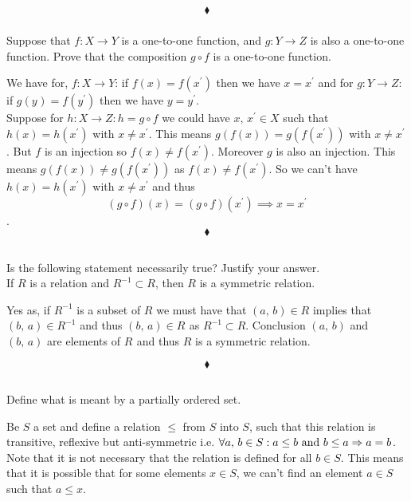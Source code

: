 $$\blacklozenge$$

\subsubsection{}
\begin{tcolorbox}
Suppose that $f:X\rightarrow Y$ is a one-to-one function, and $g: Y \rightarrow Z$ is also a one-to-one function. Prove that the composition $g \circ f$ is a one-to-one function. 
\end{tcolorbox}
We have for, $f:X\rightarrow Y$: if $f(x)=f(x^{'})$ then we have $x=x^{'}$ and for $g:Y\rightarrow Z$: if $g(y^{})=f(y^{'})$ then we have $y=y^{'}$.\\
Suppose for $h:X\rightarrow Z: h=g\circ f$ we could have $x,\, x^{'}\in X$ such that  $h(x)=h(x^{'})$  with $x\neq x^{'}$.
This means $g(f(x))=g(f(x^{'}))$ with $x\neq x^{'}$. But $f$ is an injection so $f(x)\neq f(x^{'})$. Moreover $g$ is also an injection. This means  $g(f(x))\neq g(f(x^{'}))$ as  $f(x)\neq f(x^{'})$. So we can't have $h(x)=h(x^{'})$ with $x\neq x^{'}$ and thus $$(g\circ f)(x)=(g\circ f)(x^{'})\implies x=x^{'}$$.
$$\blacklozenge$$


\renewcommand{\thesubsection}{\thesection.\RomanNumeralCaps{9}}
\subsection{}
\begin{tcolorbox}
Is the following statement necessarily true? Justify your answer.\\ If $R$ is a relation and $R^{-1} \subset R$, then $R$ is a symmetric relation. 
\end{tcolorbox}
Yes as, if $R^{-1}$ is a subset of $R$  we must  have that $(a,\, b) \in R$ implies that  $(b,\, a) \in R^{-1}$ and thus $(b,\, a) \in R^{}$ as $R^{-1} \subset R$. Conclusion  $(a,\, b)$ and  $(b,\, a)$ are elements of $R^{}$ and thus $R$ is a symmetric relation. 

$$\blacklozenge$$
\newpage

\renewcommand{\thesubsection}{\thesection.\RomanNumeralCaps{10}}
\subsection{}
\subsubsection{}
\begin{tcolorbox}
Define what is meant by a partially ordered set.
\end{tcolorbox}
Be $S$ a set and define a relation $\leq$ from $S$ into $S$, such that this relation is transitive, reflexive but anti-symmetric i.e. $\forall a,\, b\in S: a\leq b\text{ and } b\leq a\Rightarrow a=b$. Note that it is not necessary that the relation is defined for all $b\in S$. This means that it is possible that for some elements $x\in S$, we can't find an element $a\in S$ such that $a\leq x$. 

